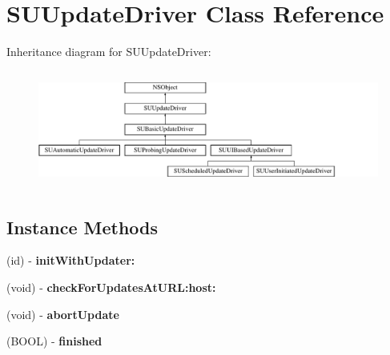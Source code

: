 \hypertarget{interface_s_u_update_driver}{}\section{S\+U\+Update\+Driver Class Reference}
\label{interface_s_u_update_driver}
Inheritance diagram for S\+U\+Update\+Driver\+:\begin{figure}[H]
\begin{center}
\leavevmode
\includegraphics[height=3.888889cm]{interface_s_u_update_driver}
\end{center}
\end{figure}
\subsection*{Instance Methods}
\begin{DoxyCompactItemize}
\item 
\mbox{\label{interface_s_u_update_driver_a214c53e38bf231f5f59083f0a3633ed3}} 
(id) -\/ {\bfseries init\+With\+Updater\+:}
\item 
\mbox{\label{interface_s_u_update_driver_a689d2feb2aafd73ffe394a351a3b4c7a}} 
(void) -\/ {\bfseries check\+For\+Updates\+At\+U\+R\+L\+:host\+:}
\item 
\mbox{\label{interface_s_u_update_driver_a2786d23292cc0ff5473d5cee2399f924}} 
(void) -\/ {\bfseries abort\+Update}
\item 
\mbox{\label{interface_s_u_update_driver_ae89e701027117f7aa90a17dd43d97e1e}} 
(B\+O\+OL) -\/ {\bfseries finished}
\end{DoxyCompactItemize}
